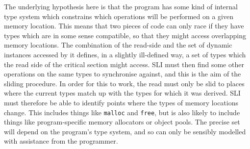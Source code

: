 The underlying hypothesis here is that the program has some kind of internal type system which constrains which operations will be performed on a given memory location.
This means that two pieces of code can only race if they have types which are in some sense compatible, so that they might access overlapping memory locations.
The combination of the read-side \StateMachine and the set of dynamic instances accessed by it defines, in a slightly ill-defined way, a set of types which the read side of the critical section might access.
SLI must then find some other operations on the same types to synchronise against, and this is the aim of the sliding procedure.
In order for this to work, the read \StateMachine must only be slid to places where the current types match up with the types for which it was derived.
SLI must therefore be able to identify points where the types of memory locations change.
This includes things like \verb|malloc| and \verb|free|, but is also likely to include things like program-specific memory allocators or object pools.
The precise set will depend on the program's type system, and so can only be sensibly modelled with assistance from the programmer.


